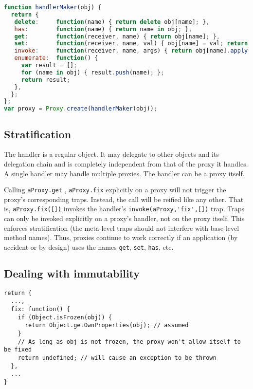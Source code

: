 \documentclass{acm_proc_article-sp}
\begin{document}
\begin{lstlisting}[language=javascript]
function handlerMaker(obj) {
  return {
   delete:     function(name) { return delete obj[name]; },    
   has:        function(name) { return name in obj; },
   get:        function(receiver, name) { return obj[name]; },
   set:        function(receiver, name, val) { obj[name] = val; return true; },
   invoke:     function(receiver, name, args) { return obj[name].apply(obj,args); },
   enumerate:  function() {
     var result = [];
     for (name in obj) { result.push(name); };
     return result;
   }, 
  };
};
var proxy = Proxy.create(handlerMaker(obj));
\end{lstlisting}

\subsection{Stratification}

The handler is a regular object. It may delegate to other objects and its delegation chain and is completely independent from that of the proxy it handles. A single handler may handle multiple proxies. The handler can be a proxy itself.

Calling \lstinline{aProxy.get} , \lstinline{aProxy.fix} explicitly on a proxy will not trigger the proxy’s corresponding traps. Instead, the call will be reified like any other. That is, \lstinline{aProxy.fix([])} invokes the handler’s \lstinline{invoke(aProxy,'fix',[])} trap. Traps can only be invoked explicitly on a proxy’s handler, not on the proxy itself. This enforces stratification (the meta-level traps should not interfere with base-level method names). Thus, proxies continue to work correctly if an application (by accident or by design) uses the names \texttt{get}, \texttt{set}, \texttt{has}, etc.

\subsection{Dealing with immutability}


\begin{lstlisting}
return {
  ...,
  fix: function() {
    if (Object.isFrozen(obj)) {
      return Object.getOwnProperties(obj); // assumed
    }
    // As long as obj is not frozen, the proxy won't allow itself to be fixed
    return undefined; // will cause an exception to be thrown
  },
  ...
}
\end{lstlisting}
\end{document}
